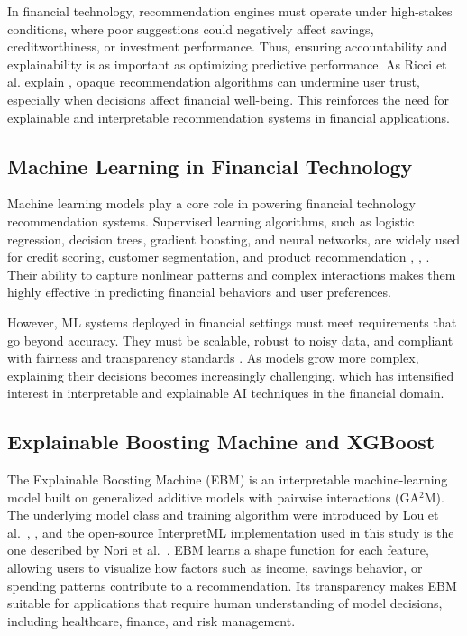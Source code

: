 \documentclass[journal]{./IEEE/IEEEtran}
\begin{document}
In financial technology, recommendation engines must operate under high-stakes conditions, where poor suggestions could negatively affect savings, creditworthiness, or investment performance. Thus, ensuring accountability and explainability is as important as optimizing predictive performance. As Ricci et al. explain \cite{ref13}, opaque recommendation algorithms can undermine user trust, especially when decisions affect financial well-being. This reinforces the need for explainable and interpretable recommendation systems in financial applications.

\subsection{Machine Learning in Financial Technology}
Machine learning models play a core role in powering financial technology recommendation systems. Supervised learning algorithms, such as logistic regression, decision trees, gradient boosting, and neural networks, are widely used for credit scoring, customer segmentation, and product recommendation \cite{ref11}, \cite{ref14}, \cite{ref56}. Their ability to capture nonlinear patterns and complex interactions makes them highly effective in predicting financial behaviors and user preferences.

However, ML systems deployed in financial settings must meet requirements that go beyond accuracy. They must be scalable, robust to noisy data, and compliant with fairness and transparency standards \cite{ref14}. As models grow more complex, explaining their decisions becomes increasingly challenging, which has intensified interest in interpretable and explainable AI techniques in the financial domain.

\subsection{Explainable Boosting Machine and XGBoost}
The Explainable Boosting Machine (EBM) is an interpretable machine-learning model built on generalized additive models with pairwise interactions (GA$^2$M). The underlying model class and training algorithm were introduced by Lou et al.\ \cite{ref48}, \cite{ref49}, and the open-source InterpretML implementation used in this study is the one described by Nori et al.\ \cite{ref15}. EBM learns a shape function for each feature, allowing users to visualize how factors such as income, savings behavior, or spending patterns contribute to a recommendation. Its transparency makes EBM suitable for applications that require human understanding of model decisions, including healthcare, finance, and risk management.
\end{document}
